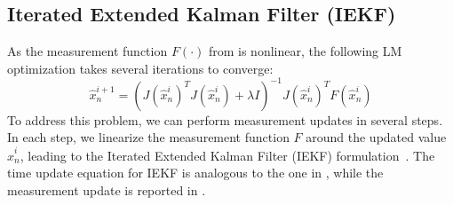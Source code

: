 \subsection{Iterated Extended Kalman Filter (IEKF)}
\label{app:iekf}
As the measurement function $F(\cdot)$ from  is nonlinear, the following LM optimization takes several iterations to converge: 
% 
\begin{equation}
\hat{x}_n^{i + 1} = (J(\hat{x}_n^i) ^T J(\hat{x}_n^i) + \lambda I)^{-1} J(\hat{x}_n^i)^T F(\hat{x}_n^i)   
\end{equation}
% 
To address this problem, we can perform measurement updates in several steps. In each step, we linearize the measurement function $F$ around the updated value $\hat{x}_n^i$, leading to the Iterated Extended Kalman Filter (IEKF) formulation~\cite{havlik2015performance}. The time update equation for IEKF is analogous to the one in , while the measurement update is reported in . 


